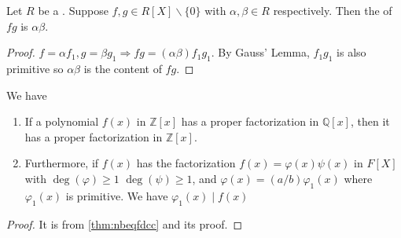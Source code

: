 \documentclass{article}
\begin{document}
\begin{cora}\label{cor:ondqegfdsfd}
Let $R$ be a . Suppose $f, g \in R[X] \backslash\{0\}$ with  $\alpha, \beta \in R$ respectively. Then the  of $f g$ is $\alpha \beta$.
\end{cora}
\begin{proof}
$f=\alpha f_{1}, g=\beta g_{1} \Rightarrow f g=(\alpha \beta) f_{1} g_{1}$. By Gauss' Lemma, $f_{1} g_{1}$ is also primitive so $\alpha \beta$ is the content of $f g$.
\end{proof}

\begin{cora}\label{cora:asdjnfdsaf}We have 
\begin{enumerate}
    \item If a polynomial $f(x)$ in $\mathbb{Z}[x]$ has a proper factorization in $\mathbb{Q}[x]$, then it has a proper factorization in $\mathbb{Z}[x]$.
    \item Furthermore, if $f(x)$ has the factorization $f(x)=\varphi(x) \psi(x)$ in $F[X]$ with $\deg(\varphi)\ge 1$ $\deg(\psi)\ge 1$, and $\varphi(x)=(a / b) \varphi_{1}(x)$ where $\varphi_{1}(x)$ is primitive. We have $\varphi_{1}(x) \mid f(x)$
\end{enumerate}
\end{cora} 
\begin{proof}
It is from \cref{thm:nbeqfdcc} and its proof.
\end{proof}
\end{document}
